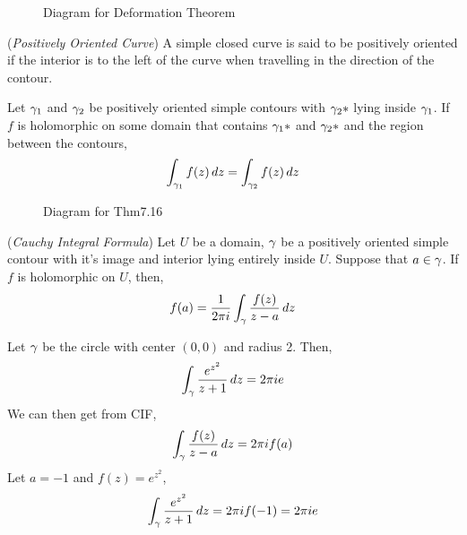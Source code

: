 \documentclass{article}
\begin{document}
\begin{figure}[!ht]
  \centering
  \caption{Diagram for Deformation Theorem}
\end{figure}

\begin{ndefi}{(\textit{Positively Oriented Curve})}
  A simple closed curve is said to be positively oriented if the interior is to the left of the curve when travelling in the direction of the contour.
\end{ndefi}

\begin{nthm}
  Let $\gamma_1$ and $\gamma_2$ be positively oriented simple contours with $\gamma_2*$ lying inside $\gamma_1$. If $f$ is holomorphic on some domain that contains $\gamma_1*$ and $\gamma_2*$ and the region between the contours,
  $$ \int_{\gamma_1} f(z)\,dz = \int_{\gamma_2} {f(z)\,dz} $$
\end{nthm}

\begin{figure}[!ht]
  \centering
  \caption{Diagram for Thm7.16}
\end{figure}

\begin{nthm}{(\textit{Cauchy Integral Formula})}
  Let $U$ be a domain, $\gamma$ be a positively oriented simple contour with it's image and interior lying entirely inside $U$. Suppose that $a\in\gamma$. If $f$ is holomorphic on $U$, then,
  $$ f(a) = \frac{1}{2\pi i}\int_\gamma {\frac{f(z)}{z-a}}\,dz $$
\end{nthm}

\begin{eg}
  Let $\gamma$ be the circle with center $(0, 0)$ and radius 2. Then,
  $$ \int_\gamma \frac{e^{z^2}}{z + 1}\,dz = 2\pi ie$$
  We can then get from CIF,
  $$ \int_\gamma \frac{f(z)}{z - a}\,dz = 2\pi i f(a) $$
  Let $a = -1$ and $f(z) = e^{z^2}$,
  $$ \int_\gamma \frac{e^{z^2}}{z+1}\,dz = 2\pi i f(-1) = 2\pi i e $$
\end{eg}
\end{document}

